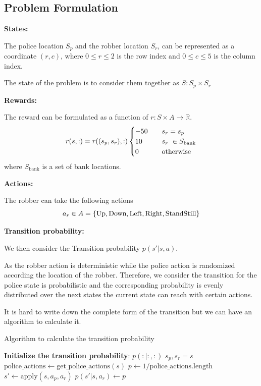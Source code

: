\documentclass{article}
\begin{document}
\subsection{Problem Formulation}
\textbf{States:}

The police location $S_p$ and the robber location $S_r$, can be represented
as a coordinate $(r, c)$,
where $0 \leq r \leq 2$ is the row index and $0 \leq c \leq 5$ is the column index.

The state of the problem is to consider them together as $S: S_p \times S_r$

\textbf{Rewards:}

The reward can be formulated as a function of $r: S\times A\rightarrow \mathbb{R}$.
\begin{equation*}
  r(s, :) = r((s_p, s_r), :)
  \begin{cases}
    -50  \quad & s_r = s_p \\
    10   \quad & s_r ~ \in S_{\text{bank}}\\
    0    \quad &\textup{otherwise}
  \end{cases}
\end{equation*}
where $S_{\text{bank}}$ is a set of bank locations.

\textbf{Actions:}

The robber can take the following actions
\begin{equation*}
  a_r \in A = \{\textup{Up},\textup{Down},\textup{Left},\textup{Right},\textup{StandStill}\}
\end{equation*}

\textbf{Transition probability:}

We then consider the Transition probability $p(s' | s, a)$.

As the robber action is deterministic while the police action is randomized
according the location of the robber.
Therefore, we consider the transition for the police state is probabilistic and
the corresponding probability is evenly distributed over the next states the current
state can reach with certain actions.

It is hard to write down the complete form of the transition but we can have an
algorithm to calculate it.

\begin{minipage}{0.9\textwidth}
  \begin{algorithm}[H]

    \centering
    \caption{Algorithm to calculate the transition probability}
    \label{algo1}
    \begin{algorithmic}
      \State \textbf{Initialize the transition probability}: $p(: | :, :)$
        \State $s_p, s_r = s$
          \State $\text{police\_actions} \gets \text{get\_police\_actions}(s)$
          \State $p \gets 1 / \text{police\_actions.length}$
            \State $s' \gets \text{apply}(s, a_p, a_r)$
            \State $p(s' | s, a_r) \gets p$
          \EndFor
        \EndFor
      \EndFor
    \end{algorithmic}
  \end{algorithm}
\end{minipage}
\end{document}
